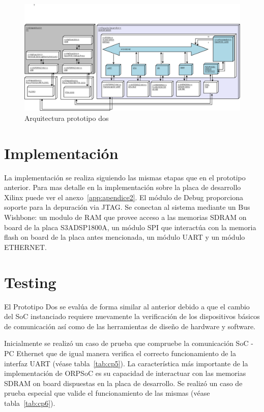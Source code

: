 		\begin{figure}[!h]
 		\begin{center}
  		\includegraphics[width=1\textwidth,keepaspectratio=true]{./images/ORPSoCdia}
  		\caption{Arquitectura prototipo dos}
  		\label{fig:orpsoc} 
 		\end{center}
		\end{figure}
	
		\section{Implementación}

		La implementación se realiza siguiendo las mismas etapas que en el prototipo anterior. Para mas detalle en la implementación sobre la placa de desarrollo Xilinx puede ver el anexo~\ref{app:apendice2}.
El módulo de Debug proporciona soporte para la depuración via JTAG. Se conectan al sistema mediante un Bus Wishbone: un modulo de RAM que provee
	acceso a las memorias SDRAM on board de la placa S3ADSP1800A, un módulo SPI que interactúa con la memoria flash on board de la placa antes
	mencionada, un módulo UART y un módulo ETHERNET.
		

		\section{Testing}
		
		El Prototipo Dos se evalúa de forma similar al anterior debido a que el cambio del SoC instanciado requiere nuevamente la verificación de los
		dispositivos básicos de comunicación así como de las herramientas de diseño de hardware y software.
		
		Inicialmente se realizó un caso de prueba que compruebe la comunicación SoC - PC  Ethernet que de igual manera verifica el correcto funcionamiento
		de la interfaz UART (véase tabla~\ref{tab:cp5}). La característica más importante de la implementación de ORPSoC es su capacidad de interactuar con las memorias SDRAM on board
		dispuestas en la placa de desarrollo. Se realizó un caso de prueba especial que valide el funcionamiento de las mismas (véase tabla~\ref{tab:cp6}).

